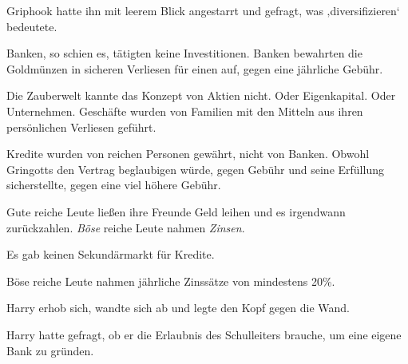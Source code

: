 Griphook hatte ihn mit leerem Blick angestarrt und gefragt, was ‚diversifizieren‘ bedeutete.

Banken, so schien es, tätigten keine Investitionen. Banken bewahrten die Goldmünzen in sicheren Verliesen für einen auf, gegen eine jährliche Gebühr.

Die Zauberwelt kannte das Konzept von Aktien nicht. Oder Eigenkapital. Oder Unternehmen. Geschäfte wurden von Familien mit den Mitteln aus ihren persönlichen Verliesen geführt.

Kredite wurden von reichen Personen gewährt, nicht von Banken. Obwohl Gringotts den Vertrag beglaubigen würde, gegen Gebühr und seine Erfüllung sicherstellte, gegen eine viel höhere Gebühr.

Gute reiche Leute ließen ihre Freunde Geld leihen und es irgendwann zurückzahlen. \emph{Böse} reiche Leute nahmen \emph{Zinsen}.%

Es gab keinen Sekundärmarkt für Kredite.

Böse reiche Leute nahmen jährliche Zinssätze von mindestens 20\%.

Harry erhob sich, wandte sich ab und legte den Kopf gegen die Wand.

Harry hatte gefragt, ob er die Erlaubnis des Schulleiters brauche, um eine eigene Bank zu gründen.

